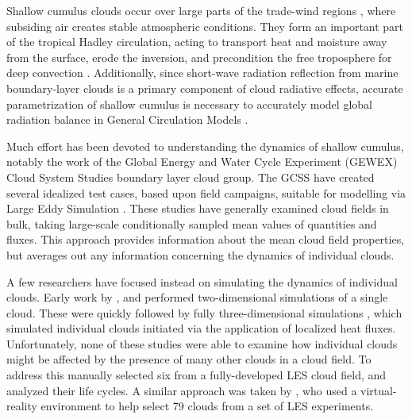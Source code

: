 \documentclass[acp]{copernicus}
\begin{document}

\introduction

Shallow cumulus clouds occur over large parts of the trade-wind regions 
\citep{Norris1988}, where subsiding air creates stable atmospheric conditions.  
They form an important part of the tropical Hadley circulation, acting to 
transport heat and moisture away from the surface, erode the inversion, and 
precondition the free troposphere for deep convection \citep{Tiedtke1988, 
Neggers2007}.  Additionally, since short-wave radiation reflection from marine 
boundary-layer clouds is a primary component of cloud radiative effects, 
accurate parametrization of shallow cumulus is necessary to accurately model 
global radiation balance in General Circulation Models 
\citep[GCMs;][]{Bony2005, Medeiros2008, Wyant2009, Medeiros2011}.
  
Much effort has been devoted to understanding the dynamics of shallow cumulus, 
notably the work of the Global Energy and Water Cycle Experiment (GEWEX) Cloud 
System Studies \citep[GCSS;][]{Randall2003} boundary layer cloud group.  The 
GCSS have created several idealized test cases, based upon field campaigns, 
suitable for modelling via Large Eddy Simulation \citep[LES;][]{Siebesma1995, 
Stevens2001, Brown2002, Ackerman2009, vanZanten2011}.  These studies have 
generally examined cloud fields in bulk, taking large-scale conditionally 
sampled mean values of quantities and fluxes.  This approach provides 
information about the mean cloud field properties, but averages out any 
information concerning the dynamics of individual clouds.

A few researchers have focused instead on simulating the dynamics of individual
clouds. Early work by \cite{Klaassen1985}, \cite{Bretherton1989} and 
\cite{Grabowski1991} performed two-dimensional simulations of a single 
cloud.  These were quickly followed by fully three-dimensional simulations 
\citep{Grabowski1993, Grabowski1993a, Carpenter1998, Blyth2005}, which 
simulated individual clouds initiated via the application of localized heat 
fluxes.  Unfortunately, none of these studies were able to examine how 
individual clouds might be affected by the presence of many other clouds in a 
cloud field.  To address this \cite{Zhao2005, Zhao2005a} manually selected six 
from a fully-developed LES cloud field, and analyzed their life cycles.  A 
similar approach was taken by \cite{Heus2009}, who used a virtual-reality 
environment to help select 79 clouds from a set of LES experiments.
\end{document}
